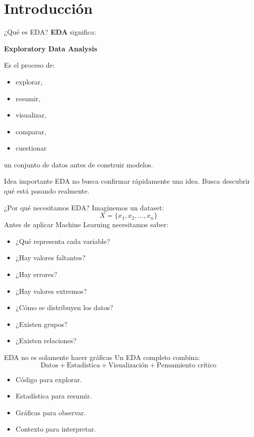 \documentclass[aspectratio=169,11pt]{beamer}
\begin{document}
\section{Introducción}
\begin{frame}{¿Qué es EDA?}
\textbf{EDA} significa:
\begin{center}
\Large
\textbf{Exploratory Data Analysis}
\end{center}
Es el proceso de:
\begin{itemize}
    \item explorar,
    \item resumir,
    \item visualizar,
    \item comparar,
    \item cuestionar
\end{itemize}
un conjunto de datos antes de construir modelos.
\begin{alertblock}{Idea importante}
EDA no busca confirmar rápidamente una idea.
Busca descubrir qué está pasando realmente.
\end{alertblock}
\end{frame}
\begin{frame}{¿Por qué necesitamos EDA?}
Imaginemos un dataset:
\[
X = \{x_1,x_2,\ldots,x_n\}
\]
Antes de aplicar Machine Learning necesitamos saber:
\begin{itemize}
    \item ¿Qué representa cada variable?
    \item ¿Hay valores faltantes?
    \item ¿Hay errores?
    \item ¿Hay valores extremos?
    \item ¿Cómo se distribuyen los datos?
    \item ¿Existen grupos?
    \item ¿Existen relaciones?
\end{itemize}
\end{frame}
\begin{frame}{EDA no es solamente hacer gráficas}
Un EDA completo combina:
\[
\boxed{
\text{Datos}
+
\text{Estadística}
+
\text{Visualización}
+
\text{Pensamiento crítico}
}
\]
\begin{itemize}
    \item Código para explorar.
    \item Estadística para resumir.
    \item Gráficas para observar.
    \item Contexto para interpretar.
\end{itemize}
\end{frame}
\end{document}
